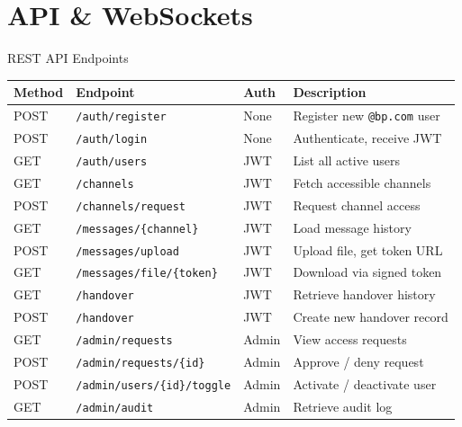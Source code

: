 \documentclass[aspectratio=169,12pt]{beamer}
\begin{document}
\section{API \& WebSockets}

\begin{frame}{REST API Endpoints}
\centering\small
\begin{tabular}{@{}lllp{5.5cm}@{}}
  \toprule
  \textbf{Method} & \textbf{Endpoint} & \textbf{Auth} & \textbf{Description} \\
  \midrule
  \rowcolor{BPGreen!10}
  POST & \texttt{/auth/register}          & None  & Register new \texttt{@bp.com} user \\
  \rowcolor{BPGreen!10}
  POST & \texttt{/auth/login}             & None  & Authenticate, receive JWT \\
  GET  & \texttt{/auth/users}             & JWT   & List all active users \\
  \rowcolor{BPDark!5}
  GET  & \texttt{/channels}              & JWT   & Fetch accessible channels \\
  \rowcolor{BPDark!5}
  POST & \texttt{/channels/request}       & JWT   & Request channel access \\
  \rowcolor{AccentBlue!8}
  GET  & \texttt{/messages/\{channel\}}  & JWT   & Load message history \\
  \rowcolor{AccentBlue!8}
  POST & \texttt{/messages/upload}        & JWT   & Upload file, get token URL \\
  \rowcolor{AccentBlue!8}
  GET  & \texttt{/messages/file/\{token\}}& JWT   & Download via signed token \\
  \rowcolor{AccentGold!10}
  GET  & \texttt{/handover}              & JWT   & Retrieve handover history \\
  \rowcolor{AccentGold!10}
  POST & \texttt{/handover}              & JWT   & Create new handover record \\
  \rowcolor{AccentRed!8}
  GET  & \texttt{/admin/requests}         & Admin & View access requests \\
  \rowcolor{AccentRed!8}
  POST & \texttt{/admin/requests/\{id\}}  & Admin & Approve / deny request \\
  \rowcolor{AccentRed!8}
  POST & \texttt{/admin/users/\{id\}/toggle}& Admin & Activate / deactivate user \\
  GET  & \texttt{/admin/audit}            & Admin & Retrieve audit log \\
  \bottomrule
\end{tabular}
\end{frame}
\end{document}
